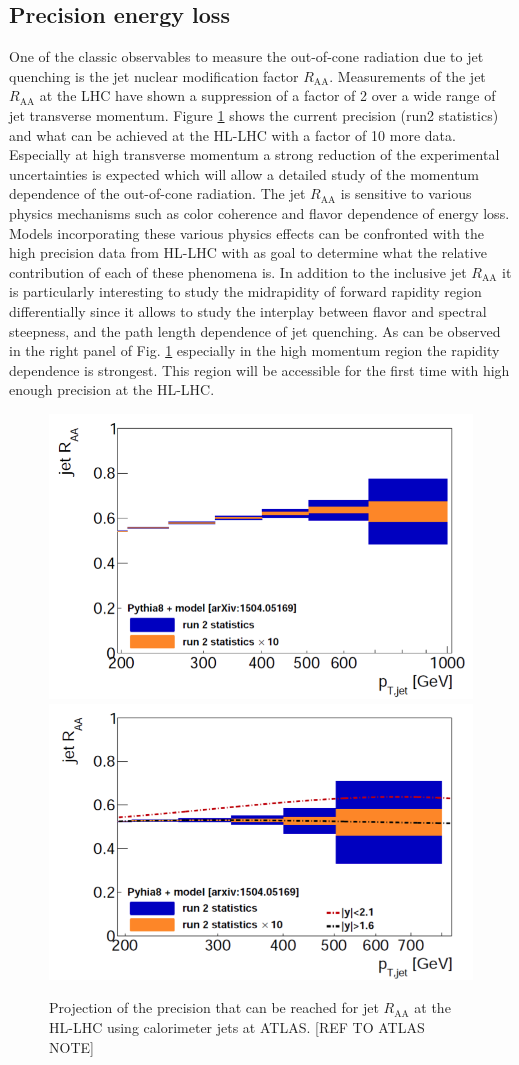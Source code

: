 \subsection{Precision energy loss}
One of the classic observables to measure the out-of-cone radiation due to jet quenching is the jet nuclear modification factor $R_{\mathrm{AA}}$. Measurements of the jet $R_{\mathrm{AA}}$ at the LHC have shown a suppression of a factor of 2 over a wide range of jet transverse momentum. Figure \ref{fig:jetRAA} shows the current precision (run2 statistics) and what can be achieved at the HL-LHC with a factor of 10 more data. Especially at high transverse momentum a strong reduction of the experimental uncertainties is expected which will allow a detailed study of the momentum dependence of the out-of-cone radiation. The jet $R_{\mathrm{AA}}$ is sensitive to various physics mechanisms such as color coherence and flavor dependence of energy loss. Models incorporating these various physics effects can be confronted with the high precision data from HL-LHC with as goal to determine what the relative contribution of each of these phenomena is. In addition to the inclusive jet $R_{\mathrm{AA}}$ it is particularly interesting to study the midrapidity of forward rapidity region differentially since it allows to study the interplay between flavor and spectral steepness, and the path length dependence of jet quenching. As can be observed in the right panel of Fig. \ref{fig:jetRAA} especially in the high momentum region the rapidity dependence is strongest. This region will be accessible for the first time with high enough precision at the HL-LHC.
\begin{figure}[!ht]
\begin{center}
\includegraphics[width=.45\textwidth]{figures/atlas/ATLASJetRAAVsPtProjection.png}
\includegraphics[width=.45\textwidth]{figures/atlas/ATLASJetRAAVsPtEtaBinsProjection.png}
\caption{Projection of the precision that can be reached for jet $R_{\mathrm{AA}}$ at the HL-LHC using calorimeter jets at ATLAS. [REF TO ATLAS NOTE]}
\label{fig:jetRAA}
\end{center}
\end{figure}


